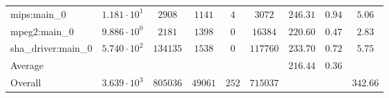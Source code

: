 \begin{tabular}{|l|c|c|c|c|c|c|c|c|}
mips:main\_0            & $ 1.181 \cdot 10^{1}  $ & $ 2908   $ & $ 1141  $ & $ 4   $ & $ 3072   $ & $ 246.31      $ & $ 0.94    $ & $ 5.06    $ \\
mpeg2:main\_0           & $ 9.886 \cdot 10^{0}  $ & $ 2181   $ & $ 1398  $ & $ 0   $ & $ 16384  $ & $ 220.60      $ & $ 0.47    $ & $ 2.83    $ \\
sha\_driver:main\_0     & $ 5.740 \cdot 10^{2}  $ & $ 134135 $ & $ 1538  $ & $ 0   $ & $ 117760 $ & $ 233.70      $ & $ 0.72    $ & $ 5.75    $ \\
\hline
Average                 & $                     $ & $        $ & $       $ & $     $ & $        $ & $ 216.44      $ & $ 0.36    $ & $         $ \\
\hline
Overall                 & $ 3.639 \cdot 10^{3}  $ & $ 805036 $ & $ 49061 $ & $ 252 $ & $ 715037 $ & $             $ & $         $ & $ 342.66  $ \\
\hline
\end{tabular}
